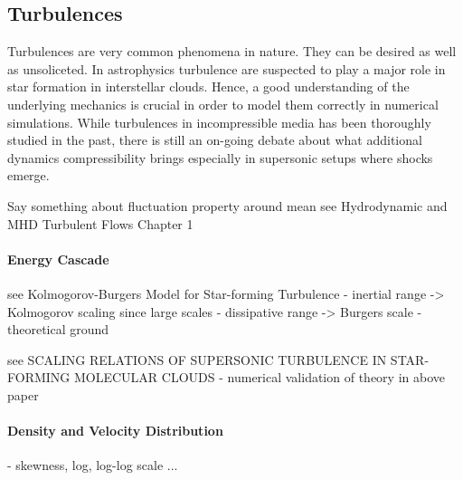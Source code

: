 \subsection{Turbulences}

Turbulences are very common phenomena in nature. They can be desired as well as
unsoliceted. In astrophysics turbulence are suspected to play a major role in
star formation in interstellar clouds. Hence, a good understanding of the
underlying mechanics is crucial in order to model them correctly in numerical
simulations. While turbulences in incompressible media has been thoroughly
studied in the past, there is still an on-going debate about what additional
dynamics compressibility brings especially in supersonic setups where shocks
emerge.

Say something about fluctuation property around mean
see Hydrodynamic and MHD Turbulent Flows Chapter 1

\paragraph{Energy Cascade}

see Kolmogorov-Burgers Model for Star-forming Turbulence
    - inertial range -> Kolmogorov scaling since large scales
    - dissipative range -> Burgers scale
    - theoretical ground

see SCALING RELATIONS OF SUPERSONIC TURBULENCE IN STAR-FORMING MOLECULAR CLOUDS
    - numerical validation of theory in above paper

\paragraph{Density and Velocity Distribution}
    - skewness, log, log-log scale ...


